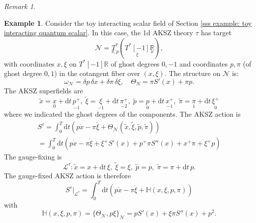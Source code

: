 \documentclass{amsart}
\theoremstyle{plain} %
\theoremstyle{definition}
\newtheorem{expl}[thm]{Example}
\theoremstyle{remark}
\newtheorem{rem}[thm]{Remark}
\newcommand{\mc}{\mathcal}
\newcommand{\mr}{\mathrm}
\newcommand{\til}{\widetilde}
\newcommand{\bl}{\color{blue}}
\newcommand{\F}{\mathcal{F}}
\newcommand{\LL}{\mathcal{L}}
\newcommand{\RR}{\mathbb{R}}
\newcommand{\xra}{\xrightarrow}
\newcommand{\dd}{\partial}
\newcommand{\N}{\mathcal{N}}
\newcommand{\ol}{\overline}
\newcommand{\dr}{\mathrm{d}}
\begin{document}
\begin{rem}

\end{rem}

\begin{expl}\label{example: toy interacting scalar: 1d AKSZ theory tau}
    Consider the toy interacting scalar field of Section \ref{sss example: toy interacting quantum scalar}. In this case, the 1d AKSZ theory $\tau$ has target 
    \begin{equation}
       \mc{N}=\underset{\pi,p}{T^*} (\underset{\xi}{T^*[-1]} \underset{x}{\RR}),
    \end{equation}
    with coordinates $x,\xi$ on $T^*[-1]\mathbb{R}$ of ghost degrees $0,-1$ and coordinates $p,\pi$ (of ghost degree $0,1$) in the cotangent fiber over $(x,\xi)$. The structure on $\mc{N}$ is:
    \begin{equation}
        \omega_\N=\delta p\, \delta x+ \delta \pi\, \delta\xi,\quad \Theta_N=\pi S'(x)+\pi p.
    \end{equation}
    The AKSZ superfields are 
    \begin{equation}
    \til{x}=\underset{0}{x}+\dr t\,\underset{-1}{p^+}, \; \til\xi=\underset{-1}{\xi}+\dr t\,\underset{-2}{\pi^+},\; \til{p}=\underset{0}{p}+\dr t\, \underset{-1}{x^+},\; \til\pi=\underset{1}{\pi}+\dr t\, \underset{0}{\xi^+}
    \end{equation}
    where we indicated the ghost degrees of the components.
    The AKSZ action is
    \begin{multline}
        S^\tau=\int_0^T \dr t (p\dot{x}-\pi \dot\xi+\Theta_\N(\til{x},\til{\xi},\til{p},\til{\pi}))\\
        =
        \int_0^T \dr t (p\dot{x}-\pi\dot\xi + \xi^+ S'(x)+p^+ \pi S''(x)+x^+ \pi+\xi^+ p)
    \end{multline}
    The gauge-fixing is
    \begin{equation}
        \LL^\tau\colon \til{x}=x+\dr t\,\xi,\; \til\xi=\xi,\; \til{p}=p,\; \til\pi=\pi+\dr t\, p.
    \end{equation}
    The gauge-fixed AKSZ action is therefore
    \begin{equation}\label{toy interacting scalar: S^tau|L^tau}
        S^\tau|_{\LL^\tau}=\int_0^T \dr t (p\dot{x}-\pi \dot\xi+
        \mathbb{H}(x,\xi,p,\pi)
        )
    \end{equation}
    with 
    \begin{equation}
        \mathbb{H}(x,\xi,p,\pi)=\{\Theta_\N,p\xi\}_\N
        =pS'(x)+ \xi\pi S''(x)+p^2.
    \end{equation}
\end{expl}
\end{document}
